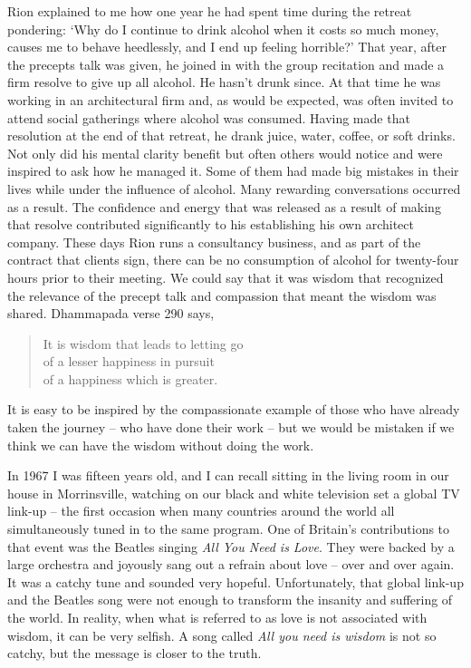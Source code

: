 Rion explained to me how one year he had spent time during the retreat
pondering: `Why do I continue to drink alcohol when it costs so much
money, causes me to behave heedlessly, and I end up feeling horrible?'
That year, after the precepts talk was given, he joined in with the
group recitation and made a firm resolve to give up all alcohol. He
hasn't drunk since. At that time he was working in an architectural firm
and, as would be expected, was often invited to attend social gatherings
where alcohol was consumed. Having made that resolution at the end of
that retreat, he drank juice, water, coffee, or soft drinks. Not
only did his mental clarity benefit but often others would notice and
were inspired to ask how he managed it. Some of them had made big
mistakes in their lives while under the influence of alcohol. Many
rewarding conversations occurred as a result. The confidence and energy
that was released as a result of making that resolve contributed
significantly to his establishing his own architect company. These days
Rion runs a consultancy business, and as part of the contract that
clients sign, there can be no consumption of alcohol for twenty-four
hours prior to their meeting. We could say that it was wisdom that recognized the relevance of the precept talk and compassion that meant the wisdom was shared. Dhammapada verse 290 says,

\begin{quote}
  It is wisdom that leads to letting go\\
  of a lesser happiness in pursuit\\
  of a happiness which is greater.
\end{quote}

It is easy to be inspired by the compassionate example of those who have already taken the journey -- who have done their work -- but we would be mistaken if we think we can have the wisdom without doing the work.

In 1967 I was fifteen years old, and I can recall sitting in the living
room in our house in Morrinsville, watching on our black and white
television set a global TV link-up\cite{satellite} -- the
first occasion when many countries around the world all simultaneously
tuned in to the same program. One of Britain's contributions to that
event was the Beatles singing \emph{All You Need is Love}. They were backed
by a large orchestra and joyously sang out a refrain about love -- over
and over again. It was a catchy tune and sounded very hopeful.
Unfortunately, that global link-up and the Beatles song were not enough
to transform the insanity and suffering of the world. In reality, when
what is referred to as love is not associated with wisdom, it can be
very selfish. A song called \emph{All you need is wisdom} is not so catchy,
but the message is closer to the truth.

